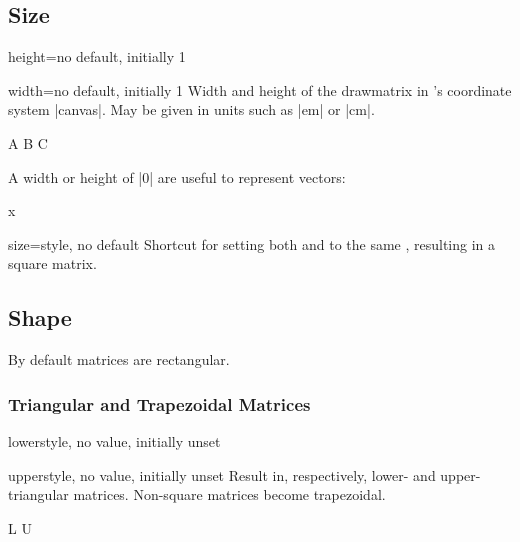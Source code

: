 \subsection{Size}

\begin{docDmKey}[][docmulti]{height}{=}{no default, initially 1}
\end{docDmKey}
\begin{docDmKey}{width}{=}{no default, initially 1}
    Width and height of the drawmatrix in \TikZ's coordinate system |canvas|.
    May be given in units such as |em| or |cm|.
    \begin{dispExample}
        \drawmatrix[width=.5]A
        \drawmatrix[width=2ex]B
        \drawmatrix[height=.35cm]C
    \end{dispExample}
\end{docDmKey}

A width or height of |0| are useful to represent vectors:
\begin{dispExample}
    \drawmatrix[width=0]x
\end{dispExample}

\begin{docDmKey}{size}{=}{style, no default}
    Shortcut for setting both  and
     to the same , resulting in a
    square matrix.
\end{docDmKey}


\subsection{Shape}

By default matrices are rectangular.


\subsubsection{Triangular and Trapezoidal Matrices}
\begin{docDmKey}[][docmulti]{lower}{}{style, no value, initially unset}
\end{docDmKey}
\begin{docDmKey}{upper}{}{style, no value, initially unset}
    Result in, respectively, lower- and upper-triangular matrices.  Non-square
    matrices become trapezoidal.
    \begin{dispExample}
        \drawmatrix[lower]L
        \drawmatrix[upper, width=1.5]U
    \end{dispExample}
\end{docDmKey}


